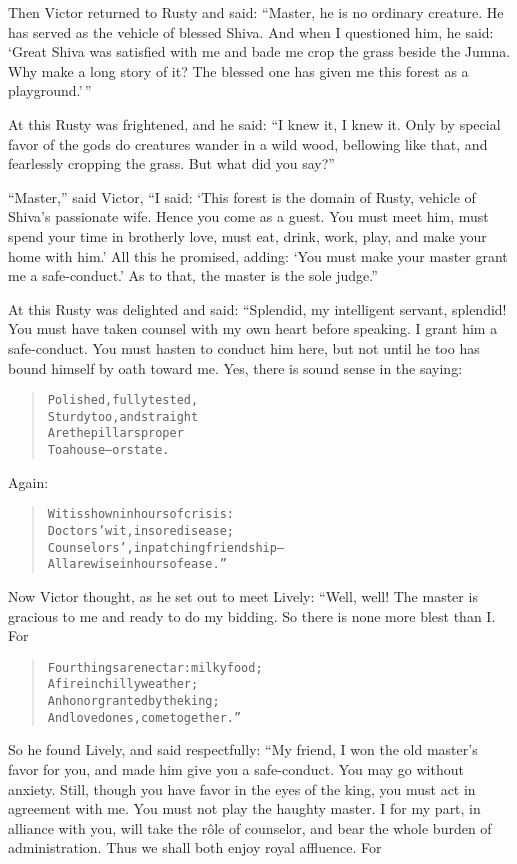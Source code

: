 \documentclass[article, twoside, 14pt]{memoir}
\renewenvironment{verbatim}{%
\begin{quote}%
\vskip -10pt%
\begin{alltt}\normalfont\large}{\end{alltt}%
\end{quote}%
\vskip -10pt
} %
\begin{document}
Then Victor returned to Rusty and said:
``Master, he is no ordinary creature. He has served as the vehicle of blessed Shiva. And when I questioned him, he said: `Great Shiva was satisfied with me and bade me crop the grass beside the Jumna. Why make a long story of it? The blessed one has given me this forest as a playground.'\,''

At this Rusty was frightened, and he said:
``I knew it, I knew it. Only by special favor of the gods do creatures wander in a wild wood, bellowing like that, and fearlessly cropping the grass. But what did you say?''

``Master,'' said Victor,
``I said: `This forest is the domain of Rusty, vehicle of Shiva's passionate wife. Hence you come as a guest. You must meet him, must spend your time in brotherly love, must eat, drink, work, play, and make your home with him.' All this he promised, adding: `You must make your master grant me a safe-conduct.' As to that, the master is the sole judge.''

At this Rusty was delighted and said: “Splendid, my intelligent
servant, splendid! You must have taken counsel with my own heart
before speaking. I grant him a safe-conduct. You must hasten to
conduct him here, but not until he too has bound himself by oath
toward me. Yes, there is sound sense in the saying:

\begin{verbatim}
Polished, fully tested,
    Sturdy too, and straight
Are the pillars proper
    To a house--or state.
\end{verbatim}
Again:

\begin{verbatim}
Wit is shown in hours of crisis:
    Doctors' wit, in sore disease;
Counselors', in patching friendship--
    All are wise in hours of ease.”
\end{verbatim}
Now Victor thought, as he set out to meet Lively: “Well, well! The
master is gracious to me and ready to do my bidding. So there is
none more blest than I. For

\begin{verbatim}
Four things are nectar: milky food;
    A fire in chilly weather;
An honor granted by the king;
    And loved ones, come together.”
\end{verbatim}
So he found Lively, and said respectfully: “My friend, I won the
old master's favor for you, and made him give you a safe-conduct.
You may go without anxiety. Still, though you have favor in the
eyes of the king, you must act in agreement with me. You must not
play the haughty master. I for my part, in alliance with you, will
take the rôle of counselor, and bear the whole burden of
administration. Thus we shall both enjoy royal affluence. For
\end{document}

